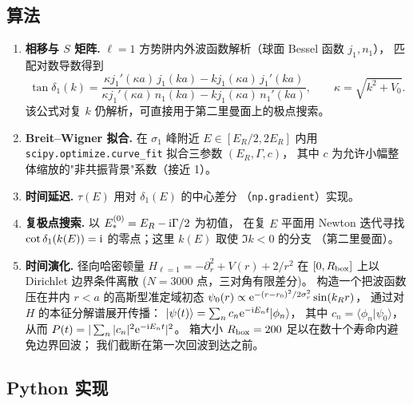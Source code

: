 \subsection*{算法}
\begin{enumerate}
  \item \textbf{相移与 $S$ 矩阵.}
        $\ell=1$ 方势阱内外波函数解析（球面 Bessel 函数 $j_{1},n_{1}$），
        匹配对数导数得到
        \begin{equation*}
          \tan\delta_{1}(k)=\frac{\kappa j_{1}'(\kappa a)\,j_{1}(ka)
            -k j_{1}(\kappa a)\,j_{1}'(ka)}
            {\kappa j_{1}'(\kappa a)\,n_{1}(ka)
            -k j_{1}(\kappa a)\,n_{1}'(ka)},
          \qquad \kappa=\sqrt{k^{2}+V_{0}}.
        \end{equation*}
        该公式对复 $k$ 仍解析，可直接用于第二里曼面上的极点搜索。
  \item \textbf{Breit--Wigner 拟合.}
        在 $\sigma_{1}$ 峰附近 $E\in[E_{R}/2,2E_{R}]$ 内用
        \verb|scipy.optimize.curve_fit| 拟合三参数 $(E_{R},\Gamma,c)$，
        其中 $c$ 为允许小幅整体缩放的"非共振背景"系数（接近 1）。
  \item \textbf{时间延迟.}
        $\tau(E)$ 用对 $\delta_{1}(E)$ 的中心差分
        （\verb|np.gradient|）实现。
  \item \textbf{复极点搜索.}
        以 $E_{*}^{(0)}=E_{R}-\mathrm{i}\Gamma/2$ 为初值，
        在复 $E$ 平面用 Newton 迭代寻找 $\cot\delta_{1}(k(E))=\mathrm{i}$
        的零点；这里 $k(E)$ 取使 $\Im k<0$ 的分支
        （第二里曼面）。
  \item \textbf{时间演化.}
        径向哈密顿量 $H_{\ell=1}=-\partial_{r}^{2}+V(r)+2/r^{2}$
        在 $[0,R_{\rm box}]$ 上以 Dirichlet 边界条件离散
        ($N=3000$ 点，三对角有限差分)。
        构造一个把波函数压在井内 $r<a$ 的高斯型准定域初态
        $\psi_{0}(r)\propto \mathrm{e}^{-(r-r_{0})^{2}/2\sigma_{r}^{2}}\sin(k_{R}r)$，
        通过对 $H$ 的本征分解谱展开传播：
        $|\psi(t)\rangle=\sum_{n}c_{n}\mathrm{e}^{-\mathrm{i} E_{n}t}|\phi_{n}\rangle$，
        其中 $c_{n}=\langle\phi_{n}|\psi_{0}\rangle$，
        从而 $P(t)=|\sum_{n}|c_{n}|^{2}\mathrm{e}^{-\mathrm{i} E_{n}t}|^{2}$。
        箱大小 $R_{\rm box}=200$ 足以在数十个寿命内避免边界回波；
        我们截断在第一次回波到达之前。
\end{enumerate}

\subsection*{Python 实现}


